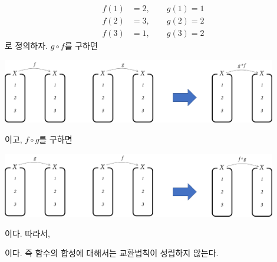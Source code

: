 \documentclass{oblivoir}
\begin{document}
\newpage
%
\label{composition7}
\begin{align*}
f(1)&=2,\qquad g(1)=1\\
f(2)&=3,\qquad g(2)=2\\
f(3)&=1,\qquad g(3)=2
\end{align*}
로 정의하자.
\(g\circ f\)를 구하면	
\begin{center}
\includegraphics[width=0.9\textwidth]{composition_7-1}
\end{center}
이고, \(f\circ g\)를 구하면
\begin{center}
\includegraphics[width=0.9\textwidth]{composition_7-2}
\end{center}
이다.
따라서,
\begin{center}
\end{center}
이다.\footnotemark
\:\:
즉 함수의 합성에 대해서는 교환법칙이 성립하지 않는다.
\end{document}
